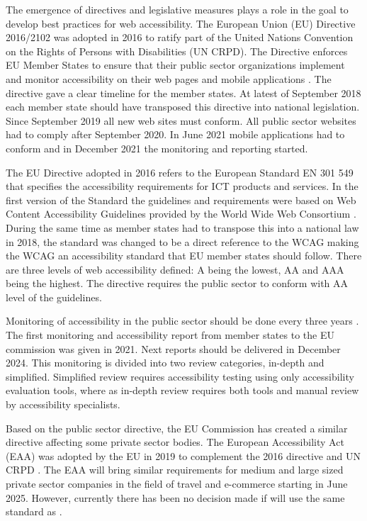 The emergence of directives and legislative measures plays a role in the goal to develop best practices for web accessibility. The European Union (EU) Directive 2016/2102 was adopted in 2016 to ratify part of the United Nations Convention on the Rights of Persons with Disabilities (UN CRPD). The Directive enforces EU Member States to ensure that their public sector organizations implement and monitor accessibility on their web pages and mobile applications \citep{eudirective2016}. The directive gave a clear timeline for the member states. At latest of September 2018 each member state should have transposed this directive into national legislation. Since September 2019 all new web sites must conform. All public sector websites had to comply after September 2020. In June 2021 mobile applications had to conform and in December 2021 the monitoring and reporting started. 

The EU Directive adopted in 2016 refers to the European Standard EN 301 549 that specifies the accessibility requirements for ICT products and services. In the first version of the Standard the guidelines and requirements were based on Web Content Accessibility Guidelines provided by the World Wide Web Consortium \citep{wcagadoptioneurope}. During the same time as member states had to transpose this into a national law in 2018, the standard was changed to be a direct reference to the WCAG making the WCAG an accessibility standard that EU member states should follow. There are three levels of web accessibility defined: A being the lowest, AA and AAA being the highest. The directive requires the public sector to conform with AA level of the guidelines.

Monitoring of accessibility in the public sector should be done every three years \citep{eudirectivemonitoring}. The first monitoring and accessibility report from member states to the EU commission was given in 2021. Next reports should be delivered in December 2024. This monitoring is divided into two review categories, in-depth and simplified. Simplified review requires accessibility testing using only accessibility evaluation tools, where as in-depth review requires both tools and manual review by accessibility specialists. 

Based on the public sector directive, the EU Commission has created a similar directive affecting some private sector bodies. The European Accessibility Act (EAA) was adopted by the EU in 2019 to complement the 2016 directive and UN CRPD \citep{eudirective2019}. The EAA will bring similar requirements for medium and large sized private sector companies in the field of travel and e-commerce starting in June 2025. However, currently there has been no decision made if \cite{eudirective2019} will use the same standard as \cite{eudirective2016}.


